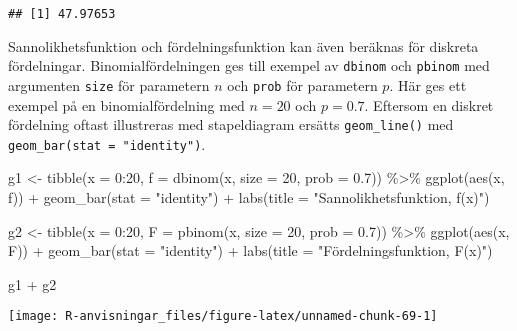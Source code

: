 \documentclass[
]{book}
\newenvironment{Shaded}{\begin{snugshade}}{\end{snugshade}}
\newcommand{\AttributeTok}[1]{\textcolor[rgb]{0.77,0.63,0.00}{#1}}
\newcommand{\DecValTok}[1]{\textcolor[rgb]{0.00,0.00,0.81}{#1}}
\newcommand{\FloatTok}[1]{\textcolor[rgb]{0.00,0.00,0.81}{#1}}
\newcommand{\FunctionTok}[1]{\textcolor[rgb]{0.00,0.00,0.00}{#1}}
\newcommand{\NormalTok}[1]{#1}
\newcommand{\OtherTok}[1]{\textcolor[rgb]{0.56,0.35,0.01}{#1}}
\newcommand{\SpecialCharTok}[1]{\textcolor[rgb]{0.00,0.00,0.00}{#1}}
\newcommand{\StringTok}[1]{\textcolor[rgb]{0.31,0.60,0.02}{#1}}
\theoremstyle{definition}
\theoremstyle{definition}
\theoremstyle{definition}
\theoremstyle{definition}
\theoremstyle{remark}
\begin{document}
\begin{verbatim}
## [1] 47.97653
\end{verbatim}

Sannolikhetsfunktion och fördelningsfunktion kan även beräknas för diskreta fördelningar. Binomialfördelningen ges till exempel av \texttt{dbinom} och \texttt{pbinom} med argumenten \texttt{size} för parametern \(n\) och \texttt{prob} för parametern \(p\). Här ges ett exempel på en binomialfördelning med \(n = 20\) och \(p = 0.7\). Eftersom en diskret fördelning oftast illustreras med stapeldiagram ersätts \texttt{geom\_line()} med \texttt{geom\_bar(stat\ =\ "identity")}.

\begin{Shaded}
\begin{Highlighting}[]
\NormalTok{g1 }\OtherTok{\textless{}{-}} \FunctionTok{tibble}\NormalTok{(}\AttributeTok{x =} \DecValTok{0}\SpecialCharTok{:}\DecValTok{20}\NormalTok{,}
             \AttributeTok{f =} \FunctionTok{dbinom}\NormalTok{(x, }\AttributeTok{size =} \DecValTok{20}\NormalTok{, }\AttributeTok{prob =} \FloatTok{0.7}\NormalTok{)) }\SpecialCharTok{\%\textgreater{}\%} 
  \FunctionTok{ggplot}\NormalTok{(}\FunctionTok{aes}\NormalTok{(x, f)) }\SpecialCharTok{+} 
  \FunctionTok{geom\_bar}\NormalTok{(}\AttributeTok{stat =} \StringTok{"identity"}\NormalTok{) }\SpecialCharTok{+}
  \FunctionTok{labs}\NormalTok{(}\AttributeTok{title =} \StringTok{"Sannolikhetsfunktion, f(x)"}\NormalTok{)}

\NormalTok{g2 }\OtherTok{\textless{}{-}} \FunctionTok{tibble}\NormalTok{(}\AttributeTok{x =} \DecValTok{0}\SpecialCharTok{:}\DecValTok{20}\NormalTok{,}
             \AttributeTok{F =} \FunctionTok{pbinom}\NormalTok{(x, }\AttributeTok{size =} \DecValTok{20}\NormalTok{, }\AttributeTok{prob =} \FloatTok{0.7}\NormalTok{)) }\SpecialCharTok{\%\textgreater{}\%} 
  \FunctionTok{ggplot}\NormalTok{(}\FunctionTok{aes}\NormalTok{(x, F)) }\SpecialCharTok{+} 
  \FunctionTok{geom\_bar}\NormalTok{(}\AttributeTok{stat =} \StringTok{"identity"}\NormalTok{) }\SpecialCharTok{+}
  \FunctionTok{labs}\NormalTok{(}\AttributeTok{title =} \StringTok{"Fördelningsfunktion, F(x)"}\NormalTok{)}

\NormalTok{g1 }\SpecialCharTok{+}\NormalTok{ g2}
\end{Highlighting}
\end{Shaded}

\begin{center}\texttt{[image: R-anvisningar\_files/figure-latex/unnamed-chunk-69-1]} \end{center}
\end{document}

